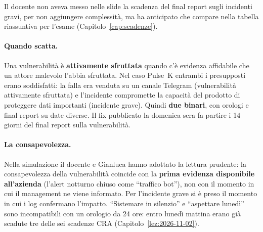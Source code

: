\begin{center}
\end{center}

Il docente non aveva messo nelle slide la scadenza del final report sugli incidenti gravi, per non
aggiungere complessità, ma ha anticipato che compare nella tabella riassuntiva per l'esame
(Capitolo~\ref{cap:scadenze}).

\paragraph{Quando scatta.} Una vulnerabilità è \textbf{attivamente sfruttata} quando c'è evidenza
affidabile che un attore malevolo l'abbia sfruttata. Nel caso Pulse~K entrambi i presupposti erano
soddisfatti: la falla era venduta su un canale Telegram (vulnerabilità attivamente sfruttata) e
l'incidente compromette la capacità del prodotto di proteggere dati importanti (incidente grave). Quindi
\textbf{due binari}, con orologi e final report su date diverse. Il fix pubblicato la domenica sera fa
partire i 14 giorni del final report sulla vulnerabilità.

\paragraph{La consapevolezza.} Nella simulazione il docente e Gianluca hanno adottato la lettura
prudente: la consapevolezza della vulnerabilità coincide con la \textbf{prima evidenza disponibile
all'azienda} (l'alert notturno chiuso come ``traffico bot''), non con il momento in cui il management ne
viene informato. Per l'incidente grave si è preso il momento in cui i log confermano l'impatto.
``Sistemare in silenzio'' e ``aspettare lunedì'' sono incompatibili con un orologio da 24 ore: entro lunedì
mattina erano già scadute tre delle sei scadenze CRA (Capitolo~\ref{lez:2026-11-02}).

